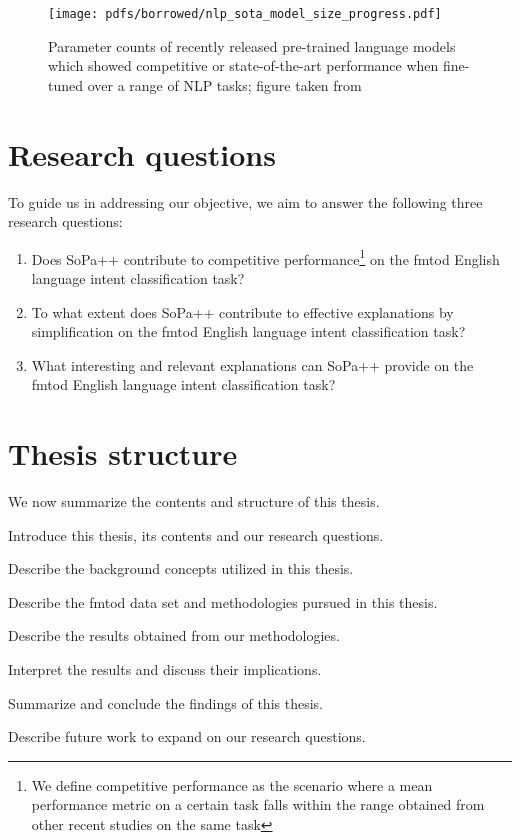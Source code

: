 \begin{figure}[t!]
  \centering
  \texttt{[image: pdfs/borrowed/nlp\_sota\_model\_size\_progress.pdf]}
  \caption{Parameter counts of recently released pre-trained language models
    which showed competitive or state-of-the-art performance when fine-tuned
    over a range of NLP tasks; figure taken from \citet{sanh2019distilbert}}
  \label{fig:nlp_progress}
\end{figure}

\section{Research questions}

\label{section:rq}

To guide us in addressing our objective, we aim to answer the following three
research questions:

\begin{enumerate}
  \item Does SoPa++ contribute to competitive performance\footnote{We define
    competitive performance as the scenario where a mean performance metric on a
    certain task falls within the range obtained from other recent studies on
    the same task} on the \ac{fmtod} English language intent classification task?
  \item To what extent does SoPa++ contribute to effective explanations by
  simplification on the \ac{fmtod} English language intent classification task?
  \item What interesting and relevant explanations can SoPa++ provide on the
  \ac{fmtod} English language intent classification task?
\end{enumerate}

\section{Thesis structure}

We now summarize the contents and structure of this thesis.

\begin{description}[align=left]
  \item [Chapter \ref{chapter:introduction}:] Introduce this thesis, its
  contents and our research questions.
  \item [Chapter \ref{chapter:background}:] Describe the background concepts
  utilized in this thesis.
  \item [Chapter \ref{chapter:methodologies}:] Describe the \ac{fmtod} data set and
  methodologies pursued in this thesis.
  \item [Chapter \ref{chapter:results}:] Describe the results obtained from our
  methodologies.
  \item [Chapter \ref{chapter:discussion}:] Interpret the results and discuss their
  implications.
  \item [Chapter \ref{chapter:conclusions}:] Summarize and conclude the findings
  of this thesis.
  \item [Chapter \ref{chapter:further_work}:] Describe future work to expand on
  our research questions.
\end{description}

